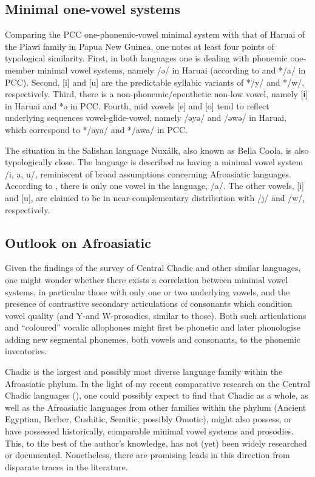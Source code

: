 \documentclass[output=paper]{langscibook}
\begin{document}
\subsection{Minimal one-vowel systems}
\label{sec:Wolff:3.5}

Comparing the PCC one-phonemic-vowel minimal system with that of Haruai of the Piawi family in Papua New Guinea, one notes at least four points of typological similarity. First, in both languages one is dealing with phonemic one-member minimal vowel systems, namely /ə/ in Haruai (according to \citet{Comrie1991} and \mbox{*/a/} in PCC). Second, [i] and [u] are the predictable syllabic variants of */y/ and */w/, respectively. Third, there is a non-phonemic/epenthetic non-low vowel, namely [ɨ] in Haruai and *ə in PCC. Fourth, mid vowels [e] and [o] tend to reflect underlying sequences vowel-glide-vowel, namely /əyə/ and /əwə/ in Haruai, which correspond to */aya/ and */awa/ in PCC. 

The situation in the Salishan language Nuxálk, also known as Bella Coola, is also typologically close. The language is described as having a minimal vowel system /i, a, u/, reminiscent of broad assumptions concerning Afroasiatic languages. According to \citet[3ff.]{Nater1984}, there is only one vowel in the language, /a/. The other vowels, [i] and [u], are claimed to be in near-complementary distribution with /j/ and /w/, respectively. 

\subsection{Outlook on Afroasiatic} 
\label{sec:Wolff:3.6}
Given the findings of the survey of Central Chadic and other similar languages, one might wonder whether there exists a correlation between minimal vowel systems, in particular those with only one or two underlying vowels, and the presence of contrastive secondary articulations of consonants which condition vowel quality (and Y-and W-prosodies, similar to those). Both such articulations and ``coloured'' vocalic allophones might first be phonetic and later phonologise adding new segmental phonemes, both vowels and consonants, to the phonemic inventories.

Chadic is the largest and possibly most diverse language family within the Afroasiatic phylum. In the light of my recent comparative research on the Central Chadic languages (\citealt{Wolff2022a, Wolffinpressb}), one could possibly expect to find that Chadic as a whole, as well as the Afroasiatic languages from other families within the phylum (Ancient Egyptian, Berber, Cushitic, Semitic, possibly Omotic), might also possess, or have possessed historically, comparable minimal vowel systems and prosodies. This, to the best of the author’s knowledge, has not (yet) been widely researched or documented. Nonetheless, there are promising leads in this direction from disparate traces in the literature.
\end{document}
